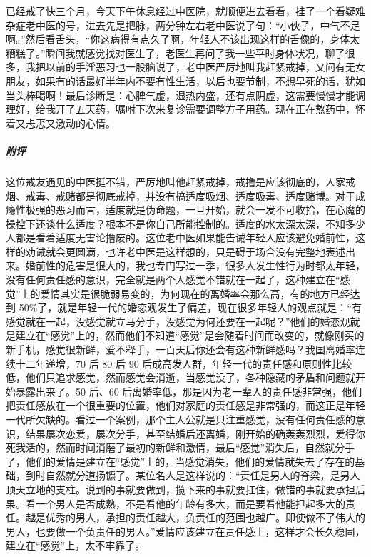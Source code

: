 \begin{case}
    已经戒了快三个月，今天下午休息经过中医院，就顺便进去看看，挂了一个看疑难杂症老中医的号，进去先是把脉，两分钟左右老中医说了句：“小伙子，中气不足啊。”然后看舌头，“你这病得有点久了啊，年轻人不该出现这样的舌像的，身体太糟糕了。”瞬间我就感觉找对医生了，老医生再问了我一些平时身体状况，聊了很多，我把以前的手淫恶习也一股脑说了，老中医严厉地叫我赶紧戒掉，又问有无女朋友，如果有的话最好半年内不要有性生活，以后也要节制，不想早死的话，犹如当头棒喝啊！最后诊断是：心脾气虚，湿热内盛，还有点阴虚，这需要慢慢才能调理好，给我开了五天药，嘱咐下次来复诊需要调整方子用药。现在正在熬药中，怀着又忐忑又激动的心情。
    \subparagraph{附评} 这位戒友遇见的中医挺不错，严厉地叫他赶紧戒掉，戒撸是应该彻底的，人家戒烟、戒毒、戒赌都是彻底戒掉，并没有搞适度吸烟、适度吸毒、适度赌博。对于成瘾性极强的恶习而言，适度就是伪命题，一旦开始，就会一发不可收拾，在心魔的操控下还谈什么适度？根本不是你自己所能控制的。适度的水太深太深，不知多少人都是看着适度无害论撸废的。这位老中医如果能告诫年轻人应该避免婚前性，这样的劝诫就会更圆满，也许老中医是这样想的，只是碍于场合没有完整地表述出来。婚前性的危害是很大的，我也专门写过一季，很多人发生性行为时都太年轻，没有任何责任感的意识，完全就是两个人感觉不错就在一起了，这种建立在“感觉”上的爱情其实是很脆弱易变的，为何现在的离婚率会那么高，有的地方已经达到 50\%了，就是年轻一代的婚恋观发生了偏差，现在很多年轻人的观点就是：“有感觉就在一起，没感觉就立马分手，没感觉为何还要在一起呢？”他们的婚恋观就是建立在“感觉”上的，然而他们不知道“感觉”是会随着时间而改变的，就像刚买的新手机，感觉很新鲜，爱不释手，一百天后你还会有这种新鲜感吗？我国离婚率连续十二年递增，70 后 80 后 90 后成高发人群，年轻一代的责任感和原则性比较低，他们只追求感觉，然而感觉会消逝，当感觉没了，各种隐藏的矛盾和问题就开始暴露出来了。50 后、60 后离婚率低，那是因为老一辈人的责任感非常强，他们把责任感放在一个很重要的位置，他们对家庭的责任感是非常强的，而这正是年轻一代所欠缺的。看过一个案例，那个主人公就是只注重感觉，没有任何责任感的意识，结果屡次恋爱，屡次分手，甚至结婚后还离婚，刚开始的确轰轰烈烈，爱得你死我活的，然而时间消磨了最初的新鲜和激情，最后“感觉”消失后，自然就分手了，他们的爱情是建立在“感觉”上的，当感觉消失，他们的爱情就失去了存在的基础，到时自然就分道扬镳了。某位名人是这样说的：“责任是男人的脊梁，是男人顶天立地的支柱。说到的事就要做到，揽下来的事就要扛住，做错的事就要承担后果。看一个男人是否成熟，不是看他的年龄有多大，而是要看他能担起多大的责任。越是优秀的男人，承担的责任越大，负责任的范围也越广。即使做不了伟大的男人，也要做一个负责任的男人。”爱情应该建立在责任感上，这样才会长久稳固，建立在“感觉”上，太不牢靠了。


\end{case}
